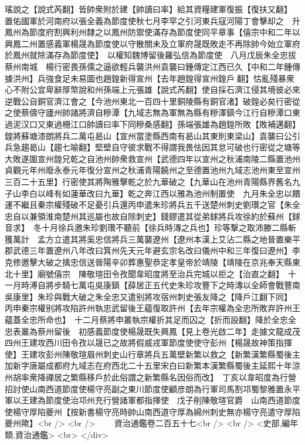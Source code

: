 瑤說之【說式芮翻】皆帥衆附於建【帥讀曰率】給其資糧建軍復振【復扶又翻】　置佑國軍於河南府以張全義為節度使秋七月李罕之引河東兵寇河陽丁會擊却之　升鳳州為節度府割興利州隸之以鳳州防禦使滿存為節度使同平章事【僖宗中和二年以興鳳二州置感義軍楊晟為節度使以守散關未及立軍府晟既敗走不再除帥今始立軍府於鳳州就除滿存為節度使】　以權知魏博留後羅弘信為節度使　八月戊辰朱全忠拔蔡州南城　楊行密畏孫儒之逼欲輕兵襲洪州袁襲曰鍾傳定江西已久【中和二年鍾傳據洪州】兵強食足未易圖也趙鍠新得宣州【去年趙鍠得宣州鍠戶翻】怙亂殘暴衆心不附公宜卑辭厚幣說和州孫端上元張雄【說式芮翻】使自採石濟江侵其境彼必來逆戰公自銅官濟江會之【今池州東北一百四十里銅陵縣有銅官渚】破鍠必矣行密從之使蔡儔守廬州帥諸將濟自糝潭【九域志無為軍無為縣有糝澤鎮今江行自糝潭口東過泥汉口又東過柵江口帥讀曰率下同糝桑感翻】孫端張雄為趙鍠所敗【敗補邁翻】鍠將蘇塘漆朗將兵二萬屯曷山【宣州當塗縣西南有曷山其東則東梁山】袁襲曰公引兵急趨曷山【趨七喻翻】堅壁自守彼求戰不得謂我畏怯因其怠可破也行密從之塘等大敗遂圍宣州鍠兄乾之自池州帥衆救宣州【武德四年以宣州之秋浦南陵二縣置池州貞觀元年州廢永泰元年復分宣州之秋浦青陽饒州之至德置池州九域志池州東至宣州三百二十五里】行密使其將陶雅擊乾之於九華破之【九華山在池州青陽縣界舊名九子山李白以峰有如蓮華改曰九華】乾之奔江西以雅為池州制置使　九月朱全忠以饋運不繼且秦宗權殘破不足憂引兵還丙申遣朱珍將兵五千送楚州刺史劉瓚之官【朱全忠自以兼領淮南楚州其巡屬也故自除刺史】錢鏐遣其從弟銶將兵攻徐約於蘇州【銶音求】　冬十月徐兵邀朱珍劉瓚不聽前【徐兵時漙之兵也】珍等撃之取沛滕二縣斬獲萬計　孟方立遣其將奚忠信將兵三萬襲遼州【遼州本漢上艾沾二縣之地晉置樂平郡武德三年置遼州八年改曰箕州先天元年避玄宗名改曰儀州中和三年復曰遼州】李克修邀擊大破之擒忠信送晉陽辛卯葬惠聖恭定孝皇帝於靖陵【靖陵在京兆奉天縣東北十里】廟號僖宗　陳敬瑄田令孜聞韋昭度將至治兵完城以拒之【治直之翻】　十一月時溥自將步騎七萬屯吳康鎮【薛居正五代史朱珍攻豐下之時漙以全師會戰豐南吳康里】朱珍與戰大破之朱全忠又遣别將攻宿州刺史張友降之【降戶江翻下同】　丙申秦宗權别將攻陷許州執忠武留後王藴復取許州【去年宗權為全忠所敗弃許州王藴蓋全忠所命也】　十二月蔡將申叢執宗權折其足而囚之【折而設翻】降於全忠全忠表叢為蔡州留後　初感義節度使楊晟既失興鳳【見上卷光啟二年】走據文龍成茂四州王建攻西川田令孜以晟已之故將假威戎軍節度使使守彭州【楊晟故神策指揮使】王建攻彭州陳敬瑄眉州刺史山行章將兵五萬壁新繁以救之【新繁漢繁縣蜀後主加新字唐屬成都府九域志在府西北二十五里宋白曰新繁本漢繁縣蜀後主延熙十年涼州胡率衆降禪居之繁縣移戶於此俗謂之新繁縣名因俗而改】　丁亥以韋昭度為行營招討使山南西道節度使楊守亮副之東川節度使顧彦朗為行軍司馬割邛蜀黎雅置永平軍以王建為節度使治邛州充行營諸軍都指揮使　戊子削陳敬瑄官爵　山南西道節度使楊守厚陷夔州【按新書楊守亮時帥山南西道守厚為綿州刺史無亦楊守亮遣守厚陷夔州歟】<br />
<br />
　　資治通鑑卷二百五十七<br />
<br />
<史部,編年類,資治通鑑>  <br>
   </div> 

